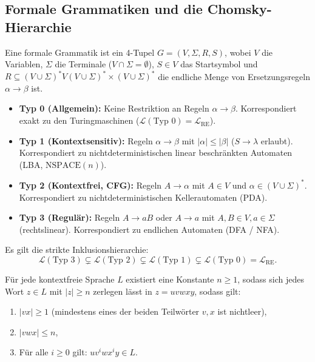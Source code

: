 \subsection{Formale Grammatiken und die Chomsky-Hierarchie}

\begin{definition}
    Eine formale Grammatik ist ein 4-Tupel $G = (V, \Sigma, R, S)$, wobei $V$ die Variablen, $\Sigma$ die Terminale ($V \cap \Sigma = \emptyset$), $S \in V$ das Startsymbol und $R \subseteq (V \cup \Sigma)^* V (V \cup \Sigma)^* \times (V \cup \Sigma)^*$ die endliche Menge von Ersetzungsregeln $\alpha \to \beta$ ist.
\end{definition}

\begin{definition}
    \begin{itemize}
        \item \textbf{Typ 0 (Allgemein):} Keine Restriktion an Regeln $\alpha \to \beta$.
        Korrespondiert exakt zu den Turingmaschinen ($\mathcal{L}(\text{Typ 0}) = \mathcal{L}_{\mathrm{RE}}$).
        \item \textbf{Typ 1 (Kontextsensitiv):} Regeln $\alpha \to \beta$ mit $|\alpha| \le |\beta|$ ($S \to \lambda$ erlaubt).
        Korrespondiert zu nichtdeterministischen linear beschränkten Automaten (LBA, $\mathrm{NSPACE}(n)$).
        \item \textbf{Typ 2 (Kontextfrei, CFG):} Regeln $A \to \alpha$ mit $A \in V$ und $\alpha \in (V \cup \Sigma)^*$.
        Korrespondiert zu nichtdeterministischen Kellerautomaten (PDA).
        \item \textbf{Typ 3 (Regulär):} Regeln $A \to a B$ oder $A \to a$ mit $A, B \in V, a \in \Sigma$ (rechtslinear).
        Korrespondiert zu endlichen Automaten (DFA / NFA).
    \end{itemize}
    Es gilt die strikte Inklusionshierarchie:
    \[
        \mathcal{L}(\text{Typ 3}) \subsetneq \mathcal{L}(\text{Typ 2}) \subsetneq \mathcal{L}(\text{Typ 1}) \subsetneq \mathcal{L}(\text{Typ 0}) = \mathcal{L}_{\mathrm{RE}}.
    \]
\end{definition}

\begin{theorem}
    Für jede kontextfreie Sprache $L$ existiert eine Konstante $n \ge 1$, sodass sich jedes Wort $z \in L$ mit $|z| \ge n$ zerlegen lässt in $z = u v w x y$, sodass gilt:
    \begin{enumerate}
        \item $|v x| \ge 1$ (mindestens eines der beiden Teilwörter $v, x$ ist nichtleer),
        \item $|v w x| \le n$,
        \item Für alle $i \ge 0$ gilt: $u v^i w x^i y \in L$.
    \end{enumerate}
\end{theorem}

